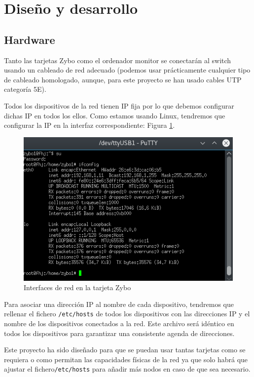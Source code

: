 \section{Diseño y desarrollo}
\subsection{Hardware}
Tanto las tarjetas Zybo como el ordenador monitor se conectarán al switch usando un cableado de red adecuado (podemos usar prácticamente cualquier tipo de cableado homologado, aunque, para este proyecto se han usado cables UTP categoría 5E).

Todos los dispositivos de la red tienen IP fija por lo que debemos configurar dichas IP en todos los ellos. Como estamos usando Linux, tendremos que configurar la IP en la interfaz correspondiente: Figura \ref{Interfaces de red en la tarjeta Zybo}.

\begin{figure}[h]
	\centering
	\includegraphics[scale=0.8]{Anexos/Anexo2/Infraestructura/ifconfigZybo.png}
	\caption{Interfaces de red en la tarjeta Zybo}
	\label{Interfaces de red en la tarjeta Zybo}
\end{figure}

Para asociar una dirección IP al nombre de cada dispositivo, tendremos que rellenar el fichero \texttt{/etc/hosts} de todos los dispositivos con las direcciones IP y el nombre de los dispositivos conectados a la red. Este archivo será idéntico en todos los dispositivos para garantizar una consistente agenda de direcciones.

Este proyecto ha sido diseñado para que se puedan usar tantas tarjetas como se requiera o como permitan las capacidades físicas de la red ya que solo habrá que ajustar el fichero\texttt{/etc/hosts} para añadir más nodos en caso de que sea necesario.

